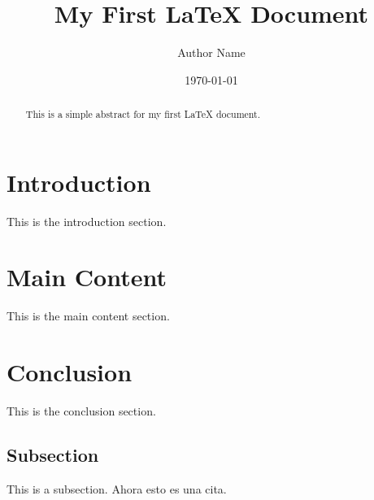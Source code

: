 \documentclass{article}
\begin{document}
\title{My First LaTeX Document}
\author{Author Name}
\date{\today}

\maketitle

\begin{abstract}
This is a simple abstract for my first LaTeX document.
\end{abstract}

\section{Introduction}
This is the introduction section.

\section{Main Content}
This is the main content section.

\section{Conclusion}
This is the conclusion section.

\subsection{Subsection}
This is a subsection. Ahora esto es una cita\cite{cafe2010salud}.



\end{document}
